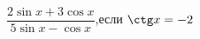 \begin{ex}[type=calculate_expression]
	\begin{condition}
		\( \dfrac{2\sin x + 3\cos x}{5\sin x - \cos x} \),\quad если \( \ctg x = -2 \)
	\end{condition}
\end{ex}
